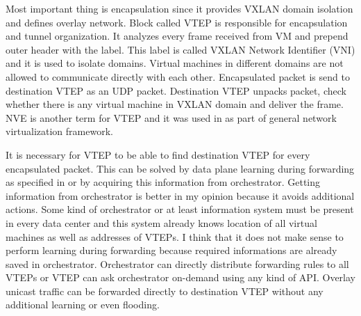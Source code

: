 Most important thing is encapsulation since it provides \Ac{VXLAN} domain isolation and defines overlay network. Block called \Ac{VTEP} is responsible for encapsulation and tunnel organization. It analyzes every frame received from \Ac{VM} and prepend outer header with the label. This label is called \Ac{VXLAN} Network Identifier (\Ac{VNI}) and it is used to isolate domains. Virtual machines in different domains are not allowed to communicate directly with each other. Encapsulated packet is send to destination \Ac{VTEP} as an \Ac{UDP} packet. Destination \Ac{VTEP} unpacks packet, check whether there is any virtual machine in \Ac{VXLAN} domain and deliver the frame. \Ac{NVE} is another term for \Ac{VTEP} and it was used in \cite{rfc7365} as part of general network virtualization framework.

It is necessary for \Ac{VTEP} to be able to find destination \Ac{VTEP} for every encapsulated packet. This can be solved by data plane learning during forwarding as specified in \cite{rfc7348} or by acquiring this information from orchestrator. Getting information from orchestrator is better in my opinion because it avoids additional actions. Some kind of orchestrator or at least information system must be present in every data center and this system already knows location of all virtual machines as well as addresses of \Ac{VTEP}s. I think that it does not make sense to perform learning during forwarding because required informations are already saved in orchestrator. Orchestrator can directly distribute forwarding rules to all \Ac{VTEP}s or \Ac{VTEP} can ask orchestrator on-demand using any kind of \Ac{API}. Overlay unicast traffic can be forwarded directly to destination \Ac{VTEP} without any additional learning or even flooding.

